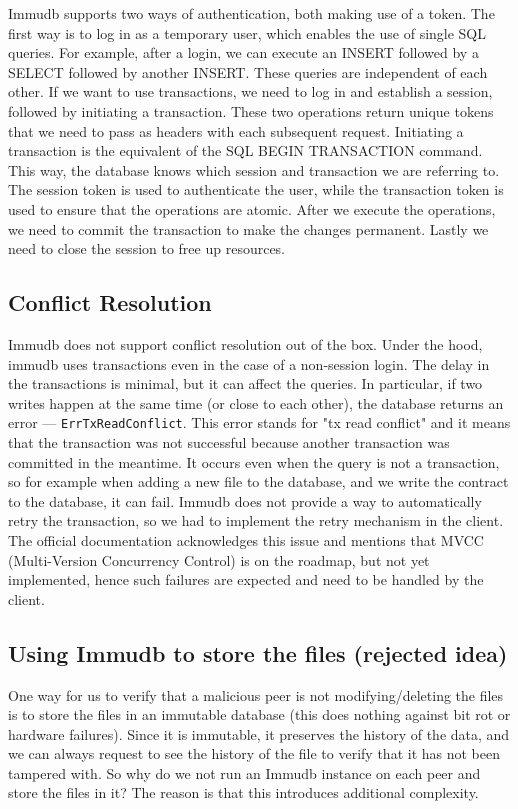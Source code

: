 Immudb supports two ways of authentication, both making use of a token.
The first way is to log in as a temporary user, which enables the use of single SQL queries.
For example, after a login, we can execute an INSERT followed by a SELECT followed by another INSERT.
These queries are independent of each other.
If we want to use transactions, we need to log in and establish a session, followed by initiating a transaction.
These two operations return unique tokens that we need to pass as headers with each subsequent request.
Initiating a transaction is the equivalent of the SQL BEGIN TRANSACTION command.
This way, the database knows which session and transaction we are referring to.
The session token is used to authenticate the user,
while the transaction token is used to ensure that the operations are atomic.
After we execute the operations, we need to commit the transaction to make the changes permanent.
Lastly we need to close the session to free up resources.

\subsection{Conflict Resolution}

Immudb does not support conflict resolution out of the box.
Under the hood, immudb uses transactions even in the case of a non-session login.
The delay in the transactions is minimal, but it can affect the queries.
In particular, if two writes happen at the same time (or close to each other),
the database returns an error --- \texttt{ErrTxReadConflict}.
This error stands for "tx read conflict" and it means that the transaction was not successful
because another transaction was committed in the meantime.
It occurs even when the query is not a transaction,
so for example when adding a new file to the database, and we write the contract to the database, it can fail.
Immudb does not provide a way to automatically retry the transaction,
so we had to implement the retry mechanism in the client.
The official documentation acknowledges this issue and mentions that MVCC (Multi-Version Concurrency Control)
is on the roadmap, but not yet implemented, hence such failures are expected and need to be handled by the client.

\subsection{Using Immudb to store the files (rejected idea)}

One way for us to verify that a malicious peer is not modifying/deleting the files is
to store the files in an immutable database (this does nothing against bit rot or hardware failures).
Since it is immutable, it preserves the history of the data, and we can always request to see the history
of the file to verify that it has not been tampered with.
So why do we not run an Immudb instance on each peer and store the files in it?
The reason is that this introduces additional complexity.

